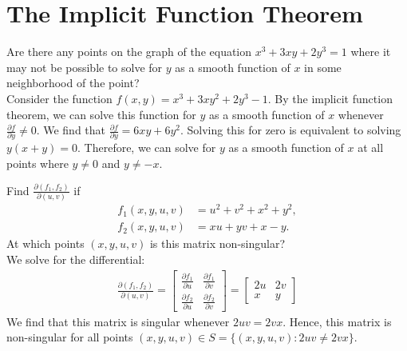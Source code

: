 \documentclass[12pt]{book}
\newenvironment{exercise}[2][Exercise]{\begin{trivlist}
\item[\hskip \labelsep {\bfseries #1}\hskip \labelsep {\bfseries #2.}]}{\end{trivlist}}
\begin{document}
\section{The Implicit Function Theorem}


\begin{exercise}{9.7.1}
    Are there any points on the graph of the equation $x^3 +3xy+2y^3=1$ where it may not be possible to solve for $y$ as a smooth function of $x$ in some neighborhood of the point?  \\
    
Consider the function $f(x,y)=x^3 + 3xy^2+2y^3 -1$. By the implicit function theorem, we can solve this function for $y$ as a smooth function of $x$ whenever $\frac{\partial f}{\partial y}\neq 0$. We find that $\frac{\partial f}{\partial y}= 6xy + 6 y^2$. Solving this for zero is equivalent to solving $y(x+y)=0$.  Therefore, we can solve for $y$ as a smooth function of $x$ at all points where $y \neq 0$ and $y \neq -x$.
\end{exercise}


\begin{exercise}{9.7.3}
    Find $\frac{\partial(f_1,f_2)}{\partial(u,v)}$ if
        \begin{align*}
            f_1(x,y,u,v) &= u^2 + v^2 + x^2 + y^2, \\
            f_2(x,y,u,v) &= xu + yv + x - y.
        \end{align*}
    At which points  $(x,y,u,v)$ is this matrix non-singular?  \\
    
    We solve for the differential:
    \begin{align*}
        \frac{\partial(f_1, f_2)}{\partial (u,v)} = \begin{bmatrix} \frac{\partial f_1}{\partial u} & \frac{\partial f_1}{\partial v} \\ \frac{\partial f_2}{\partial u} & \frac{\partial f_2}{\partial v} \end{bmatrix} = \begin{bmatrix} 2 u & 2 v \\ x & y \end{bmatrix}
    \end{align*}
    We find that this matrix is singular whenever $2 u v= 2 vx$. Hence, this matrix is non-singular for all points $(x,y,u,v) \in S = \{(x,y,u,v) : 2 u v \neq 2 vx \}$.
\end{exercise}
\end{document}
